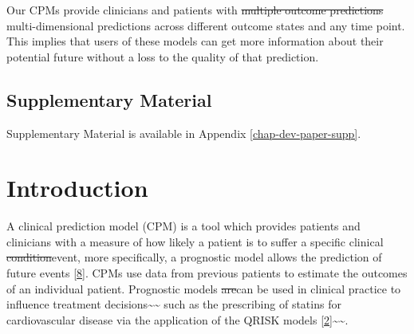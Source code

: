 \documentclass[12pt,PhD,twoside,openright]{muthesis}
\begin{document}
Our CPMs provide clinicians and patients with \sout{multiple outcome predictions} multi-dimensional predictions across different outcome states and any time point. This implies that users of these models can get more information about their potential future without a loss to the quality of that prediction.

\hypertarget{supplementary-material-2}{%
\subsection*{Supplementary Material}\label{supplementary-material-2}}

Supplementary Material is available in Appendix \ref{chap-dev-paper-supp}.

\hypertarget{introduction-7}{%
\section{Introduction}\label{introduction-7}}

A clinical prediction model (CPM) is a tool which provides patients and clinicians with a measure of how likely a patient is to suffer a specific clinical \sout{condition}event, more specifically, a prognostic model allows the prediction of future events {[}\protect\hyperlink{ref-steyerberg_prognosis_2013}{8}{]}. CPMs use data from previous patients to estimate the outcomes of an individual patient. Prognostic models \sout{are}can be used in clinical practice to influence treatment decisions\textasciitilde\textasciitilde{} such as the prescribing of statins for cardiovascular disease via the application of the QRISK models {[}\protect\hyperlink{ref-hippisley-cox_development_2017}{2}{]}\textasciitilde\textasciitilde.
\end{document}
